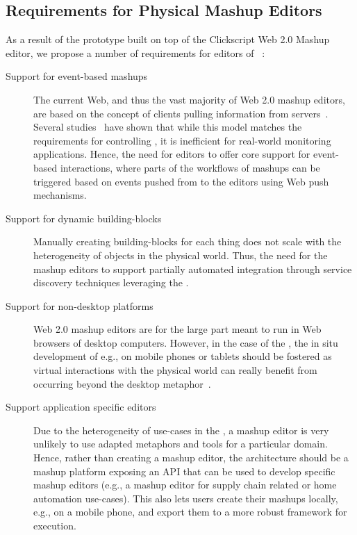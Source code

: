 \subsection{Requirements for Physical Mashup Editors}
As a result of the prototype built on top of the Clickscript Web 2.0 Mashup editor, we propose a number of requirements for editors of \pMashups{}~\cite{Guinard2010-mashup-home}:
\begin{description} 
  \item[Support for event-based mashups] The current Web, and thus the vast majority of Web 2.0 mashup editors, are based on the concept of clients pulling information from servers~\cite{Yu2008a}. Several studies~\cite{Duquennoy2009a,Trifa2010} have shown that while this model matches the requirements for controlling \sts{}, it is inefficient for real-world monitoring applications. Hence, the need for \pMashups{} editors to offer core support for event-based interactions, where parts of the workflows of mashups can be triggered based on events pushed from \sts{} to the editors using Web push mechanisms.

  \item[Support for dynamic building-blocks] Manually creating building-blocks for each thing does not scale with the heterogeneity of objects in the physical world. Thus, the need for the mashup editors to support partially automated integration through service discovery techniques leveraging the \findLayer{}.

  \item[Support for non-desktop platforms] Web 2.0 mashup editors are for the large part meant to run in Web browsers of desktop computers. However, in the case of the \WoTLong, the in situ development of \pMashups{} e.g., on mobile phones or tablets should be fostered as virtual interactions with the physical world can really benefit from occurring beyond the desktop metaphor~\cite{Brodt2008,Ullmer1998}.

  \item[Support application specific editors] Due to the heterogeneity of use-cases in the \WoTLong, a  mashup editor is very unlikely to use adapted metaphors and tools for a particular domain. Hence, rather than creating a mashup editor, the architecture should be a mashup platform exposing an API that can be used to develop specific mashup editors (e.g., a mashup editor for supply chain related or home automation use-cases). This also lets users create their mashups locally, e.g., on a mobile phone, and export them to a more robust framework for execution.
\end{description}

